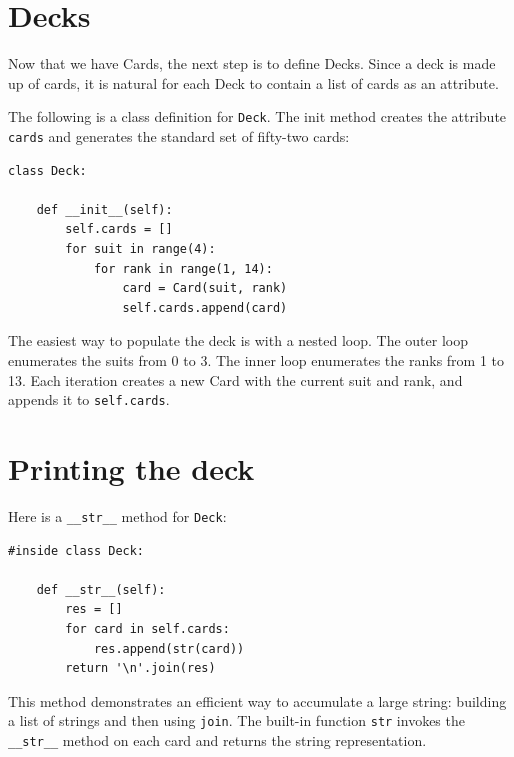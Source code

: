 \documentclass[10pt]{book}
\begin{document}
\section{Decks}

Now that we have Cards, the next step is to define Decks.  Since a
deck is made up of cards, it is natural for each Deck to contain a
list of cards as an attribute.


The following is a class definition for {\tt Deck}.  The
init method creates the attribute {\tt cards} and generates
the standard set of fifty-two cards:



\beforeverb
\begin{verbatim}
class Deck:

    def __init__(self):
        self.cards = []
        for suit in range(4):
            for rank in range(1, 14):
                card = Card(suit, rank)
                self.cards.append(card)
\end{verbatim}
\afterverb
%
The easiest way to populate the deck is with a nested loop.  The outer
loop enumerates the suits from 0 to 3.  The inner loop enumerates the
ranks from 1 to 13.  Each iteration
creates a new Card with the current suit and rank,
and appends it to {\tt self.cards}.



\section{Printing the deck}
\label{printdeck}


Here is a \verb"__str__" method for {\tt Deck}:

\beforeverb
\begin{verbatim}
#inside class Deck:

    def __str__(self):
        res = []
        for card in self.cards:
            res.append(str(card))
        return '\n'.join(res)
\end{verbatim}
\afterverb
%
This method demonstrates an efficient way to accumulate a large
string: building a list of strings and then using {\tt join}.
The built-in function {\tt str} invokes the \verb"__str__"
method on each card and returns the string representation.
\end{document}
